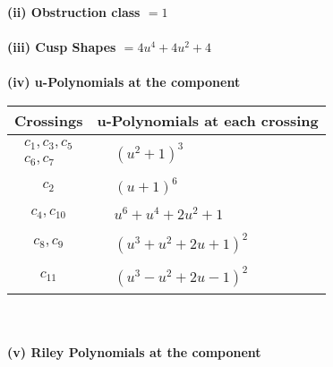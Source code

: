 \documentclass[1p]{elsarticle_modified}
\theoremstyle{definition}
\begin{document}
\flushleft \textbf{(ii) Obstruction class $= 1$}\\~\\
\flushleft \textbf{(iii) Cusp Shapes $= 4 u^4+4 u^2+4$}\\~\\
\newpage\renewcommand{\arraystretch}{1}
\flushleft \textbf{(iv) u-Polynomials at the component}\newline \\
\begin{tabular}{m{50pt}|m{274pt}}
Crossings & \hspace{64pt}u-Polynomials at each crossing \\
\hline $$\begin{aligned}c_{1},c_{3},c_{5}\\c_{6},c_{7}\end{aligned}$$&$\begin{aligned}
&(u^2+1)^3
\end{aligned}$\\
\hline $$\begin{aligned}c_{2}\end{aligned}$$&$\begin{aligned}
&(u+1)^6
\end{aligned}$\\
\hline $$\begin{aligned}c_{4},c_{10}\end{aligned}$$&$\begin{aligned}
&u^6+u^4+2 u^2+1
\end{aligned}$\\
\hline $$\begin{aligned}c_{8},c_{9}\end{aligned}$$&$\begin{aligned}
&(u^3+u^2+2 u+1)^2
\end{aligned}$\\
\hline $$\begin{aligned}c_{11}\end{aligned}$$&$\begin{aligned}
&(u^3- u^2+2 u-1)^2
\end{aligned}$\\
\hline
\end{tabular}\\~\\
\newpage\renewcommand{\arraystretch}{1}
\flushleft \textbf{(v) Riley Polynomials at the component}\newline \\
\end{document}
